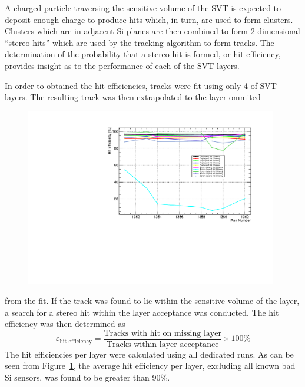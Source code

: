 
%
%
 
A charged particle traversing the sensitive volume of the SVT is expected to
deposit enough charge to produce hits which, in turn, are used to form 
clusters. Clusters which are in adjacent Si planes are then combined to form
2-dimensional ``stereo hits'' which are used by the tracking algorithm to 
form tracks.  The determination of the probability that a stereo hit is 
formed, or hit efficiency, provides insight as to the performance of each of 
the SVT layers.

In order to obtained the hit efficiencies, tracks were fit using only 4 of 
SVT layers. The resulting track was then extrapolated to the layer ommited
\begin{figure}[h]
    \begin{center}
    	\includegraphics[width=0.98\textwidth]{test2012/svtperformance/trk_performance/hit_efficiency_vs_rn.pdf}
        \caption{} 
	\label{fig:hit_efficiency}
    \end{center}
\end{figure}
from the fit. If the track was found to lie within the sensitive volume
of the layer, a search for a stereo hit within the layer acceptance was 
conducted.  The hit efficiency was then determined as
\[
    \varepsilon_{\mbox{hit efficiency}} = \frac{\mbox{Tracks with hit on missing layer}}
                                            {\mbox{Tracks within layer acceptance}} \times 100 \%
\]
The hit efficiencies per layer were calculated using all dedicated runs. As 
can be seen from Figure~\ref{fig:hit_efficiency}, the average hit efficiency
per layer, excluding all known bad Si sensors, was found to be greater than
90\%.

